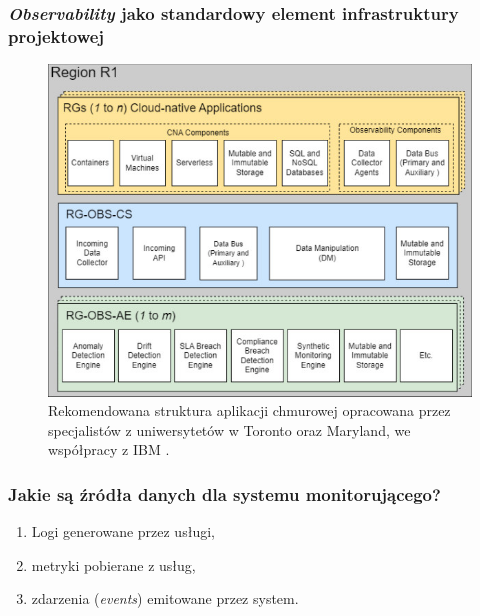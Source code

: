 \documentclass[]{beamer}
\begin{document}
\begin{frame}
  \frametitle{\textit{Observability} jako standardowy element infrastruktury projektowej}
  \begin{figure}
    \centering
    \includegraphics[width=0.6\linewidth]{cloud_architecture_proposal.jpg}
    \caption{Rekomendowana struktura aplikacji chmurowej opracowana przez specjalistów z uniwersytetów w Toronto oraz Maryland, we współpracy z IBM \cite{ibm}.}
  \end{figure}
\end{frame}

\begin{frame}
  \frametitle{Jakie są źródła danych dla systemu monitorującego?}
  \begin{enumerate}
    \item Logi generowane przez usługi,
    \item metryki pobierane z usług,
    \item zdarzenia (\textit{events}) emitowane przez system.
  \end{enumerate}
\end{frame}
\end{document}
